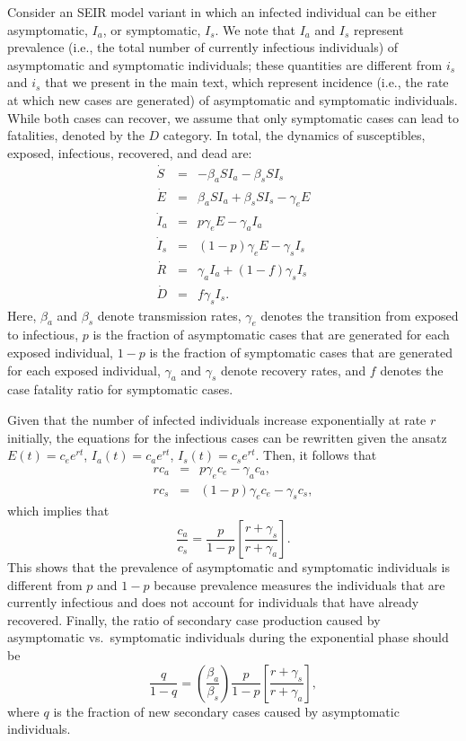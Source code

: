 \documentclass[12pt]{article}
\begin{document}
Consider an SEIR model variant in which an infected individual can be either asymptomatic, $I_a$, or symptomatic, $I_s$.
We note that $I_a$ and $I_s$ represent prevalence (i.e., the total number of currently infectious individuals) of asymptomatic and symptomatic individuals; these quantities are different from $i_s$ and $i_s$ that we present in the main text, which represent incidence (i.e., the rate at which new cases are generated)  of asymptomatic and symptomatic individuals.
While both cases can recover, we assume that only symptomatic cases can lead to fatalities, denoted
by the $D$ category.
In total, the dynamics of susceptibles, exposed, infectious, recovered, and dead are:
\begin{eqnarray}
\dot{S}&=&-\beta_a S I_a -\beta_s S I_s \\
\dot{E}&=&\beta_a S I_a +\beta_s S I_s -\gamma_e E\\
\dot{I}_a&=&p\gamma_e E-\gamma_a I_a\\
\dot{I}_s&=&(1-p)\gamma_e E-\gamma_s I_s\\
\dot{R}&=&\gamma_a I_a + (1-f)\gamma_s I_s \\
\dot{D}&=&f\gamma_s I_s.
\end{eqnarray}
Here, $\beta_a$ and $\beta_s$ denote transmission rates,
$\gamma_e$ denotes the transition from exposed to infectious,
$p$ is the fraction of asymptomatic cases that
are generated for each exposed individual,
$1-p$ is the fraction of symptomatic cases that
are generated for each exposed individual,
$\gamma_a$ and $\gamma_s$ denote recovery rates,
and $f$ denotes the case fatality ratio for symptomatic cases.

Given that the number of infected individuals increase exponentially at rate $r$ initially, the equations
for the infectious cases can be rewritten given the ansatz
$E(t)=c_e e^{rt}$,
$I_a(t)=c_a e^{rt}$,
$I_s(t)=c_s e^{rt}$.
Then, it follows that 
\begin{eqnarray}
r c_a&=&p\gamma_e c_e-\gamma_a c_a,\\
r c_s&=&(1-p)\gamma_e c_e-\gamma_s c_s,
\end{eqnarray} 
which implies that
\begin{equation}
\frac{c_a}{c_s}=\frac{p}{1-p}\left[\frac{r+\gamma_s}{r+\gamma_a}\right].
\end{equation}
This shows that the prevalence of asymptomatic and symptomatic individuals is different from $p$ and $1-p$ because prevalence measures the individuals that are currently infectious and does not account for individuals that have already recovered.
Finally, the ratio of secondary case production caused by asymptomatic vs.~symptomatic
individuals during the exponential phase should be
\begin{equation}
\frac{q}{1-q} = \left(\frac{\beta_a}{\beta_s}\right)\frac{p}{1-p}\left[\frac{r+\gamma_s}{r+\gamma_a}\right],
\end{equation}
where $q$ is the fraction of new secondary cases caused by
asymptomatic individuals.
\end{document}
